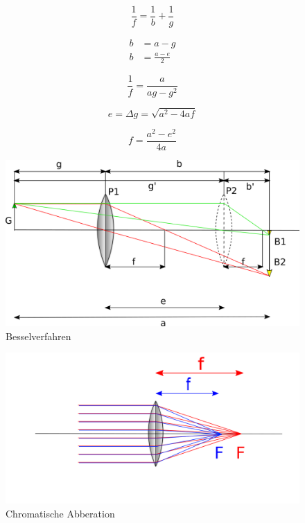 \begin{equation} \label{Linsengleichung}
    \frac{1}{f} = \frac{1}{b} + \frac{1}{g}
\end{equation}

\begin{align} \label{Relation}
    b &= a - g   \\
    \nonumber b &= \frac{a-e}{2} 
\end{align}

\begin{equation} \label{Gleichung}
    \frac{1}{f} = \frac{a}{ag-g^2}
\end{equation}

\begin{equation} \label{Defe}
    e = \Delta g = \sqrt{a^2-4af}
\end{equation}

\begin{equation} \label{Gleichungf}
    f = \frac{a^2-e^2}{4a}
\end{equation}

\begin{figure}
    \centering
    \includegraphics{Geometrische_Optik/Protokoll/fig/Besselverfahren.png}
    \caption{Besselverfahren}
    \label{fig:Besselverfahren}
\end{figure}

\begin{figure}
    \centering
    \includegraphics[scale=0.8]{Geometrische_Optik/Protokoll/fig/Chromatische Abberation.png}
    \caption{Chromatische Abberation}
    \label{fig:Chromatische Abberation}
\end{figure}

